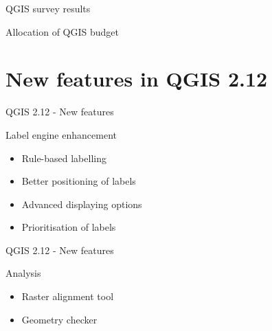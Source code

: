 \begin{frame}{QGIS survey results}
	\begin{block}{Allocation of QGIS budget}
	\end{block}
\end{frame}

\section{New features in QGIS 2.12}
\begin{frame}{QGIS 2.12 - New features}
	\begin{block}{Label engine enhancement}
		\begin{itemize}
			\item Rule-based labelling
			\item Better positioning of labels
			\item Advanced displaying options
			\item Prioritisation of labels
		\end{itemize}
	\end{block}
\end{frame}

\begin{frame}{QGIS 2.12 - New features}
	\begin{block}{Analysis}
		\begin{itemize}
			\item Raster alignment tool
			\item Geometry checker
		\end{itemize}
	\end{block}
\end{frame}

